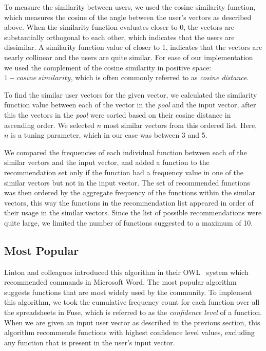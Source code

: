 \documentclass[conference]{IEEEtran}
\begin{document}
\begin{comment}
Given the function vector for two users $a$ and $b$ as $V_a$ and $V_b$ respectively, the similarity function $s$ is given by:

\begin{center}
	\[
	s(a, b) = \cos({}_{V_a}\theta_{V_b}) = \frac{V_a \cdot V_b}{||V_a|| ||V_b||} = \frac{\sum\limits_{k=1}^{n} V_{a_k}V_{b_k}}{\sqrt{\sum\limits_{k=1}^{n} {V_{a_k}}^2  {V_{b_k}}^2}}
	\]
\end{center}
\end{comment}

To measure the similarity between users, we used the cosine similarity function, which measures the cosine of the angle between the user's vectors as described above. When the similarity function evaluates closer to 0, the vectors are substantially orthogonal to each other, which indicates that the users are dissimilar. A similarity function value of closer to 1, indicates that the vectors are nearly collinear and the users are quite similar. For ease of our implementation we used the complement of the cosine similarity in positive space: $1 - cosine \ similarity$, which is often commonly referred to as \textit{cosine distance}.

To find the similar user vectors for the given vector, we calculated the similarity function value between each of the vector in the \textit{pool} and the input vector, after this the vectors in the \textit{pool} were sorted based on their cosine distance in ascending order. We selected $n$ most similar vectors from this ordered list. Here, $n$ is a tuning parameter, which in our case was between 3 and 5.

We compared the frequencies of each individual function between each of the similar vectors and the input vector, and added a function to the recommendation set only if the function had a frequency value in one of the similar vectors but not in the input vector. The set of recommended functions was then ordered by the aggregate frequency of the functions within the similar vectors, this way the functions in the recommendation list appeared in order of their usage in the similar vectors. Since the list of possible recommendations were quite large, we limited the number of functions suggested to a maximum of 10.

\subsection{Most Popular}
Linton and colleagues introduced this algorithm in their OWL~\cite{linton2000owl} system which recommended commands in Microsoft Word. The most popular algorithm suggests functions that are most widely used by the community. To implement this algorithm, we took the cumulative frequency count for each function over all the spreadsheets in Fuse, which is referred to as the \textit{confidence level} of a function. When we are given an input user vector as described in the previous section, this algorithm recommends functions with highest confidence level values, excluding any function that is present in the user's input vector.
\end{document}
